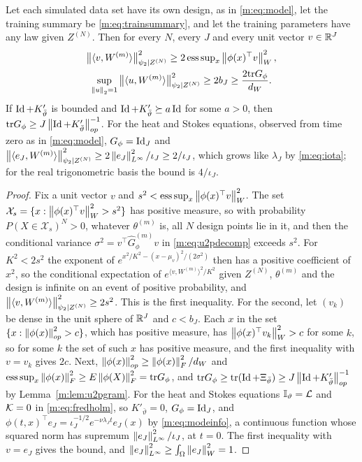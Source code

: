 \begin{proposition}\label{m:prop:u2pfalse}
Let each simulated data set have its own design, as in \eqref{m:eq:model}, let the training summary be \eqref{m:eq:trainsummary}, and let the training parameters have any law given $Z^{(N)}$. Then for every $N$, every $J$ and every unit vector $v\in\mathbb{R}^J$
\[
\begin{gathered}
\big\|\langle v,W^{(m)}\rangle\big\|^2_{\psi_2\mid Z^{(N)}}\ge2\,\mathrm{ess\,sup}_x\left\|\phi(x)^\top v\right\|^2_W ,\\
\sup_{\left\|u\right\|_2=1}\big\|\langle u,W^{(m)}\rangle\big\|^2_{\psi_2\mid Z^{(N)}}\ge2b_J\ge\frac{2\mathrm{tr} G_\phi}{d_W} .
\end{gathered}
\]
If $\operatorname{Id}+K'_{\bar\vartheta}$ is bounded and $\operatorname{Id}+K'_{\bar\vartheta}\succeq a\operatorname{Id}$ for some $a>0$, then $\mathrm{tr} G_\phi\ge J\left\|\operatorname{Id}+K'_{\bar\vartheta}\right\|^{-1}_{op}$. For the heat and Stokes equations, observed from time zero as in \eqref{m:eq:model}, $G_\phi=\operatorname{Id}_J$ and $\left\|\langle e_J,W^{(m)}\rangle\right\|^2_{\psi_2\mid Z^{(N)}}\ge2\left\|e_J\right\|^2_{L^\infty}/\iota_J\ge2/\iota_J$, which grows like $\lambda_J$ by \eqref{m:eq:iota}; for the real trigonometric basis the bound is $4/\iota_J$.
\end{proposition}

\begin{proof}
Fix a unit vector $v$ and $s^2<\mathrm{ess\,sup}_x\left\|\phi(x)^\top v\right\|^2_W$. The set $\mathcal X_s=\{x:\left\|\phi(x)^\top v\right\|^2_W>s^2\}$ has positive measure, so with probability $P(X\in\mathcal X_s)^N>0$, whatever $\theta^{(m)}$ is, all $N$ design points lie in it, and then the conditional variance $\sigma^2=v^\top\hat G^{(m)}_\phi v$ in \eqref{m:eq:u2pdecomp} exceeds $s^2$. For $K^2<2s^2$ the exponent of $e^{x^2/K^2-(x-\mu_v)^2/(2\sigma^2)}$ then has a positive coefficient of $x^2$, so the conditional expectation of $e^{\langle v,W^{(m)}\rangle^2/K^2}$ given $Z^{(N)}$, $\theta^{(m)}$ and the design is infinite on an event of positive probability, and $\left\|\langle v,W^{(m)}\rangle\right\|^2_{\psi_2\mid Z^{(N)}}\ge2s^2$. This is the first inequality. For the second, let $(v_k)$ be dense in the unit sphere of $\mathbb{R}^J$ and $c<b_J$. Each $x$ in the set $\{x:\left\|\phi(x)\right\|^2_{op}>c\}$, which has positive measure, has $\left\|\phi(x)^\top v_k\right\|^2_W>c$ for some $k$, so for some $k$ the set of such $x$ has positive measure, and the first inequality with $v=v_k$ gives $2c$. Next, $\left\|\phi(x)\right\|^2_{op}\ge\left\|\phi(x)\right\|^2_F/d_W$ and $\mathrm{ess\,sup}_x\left\|\phi(x)\right\|^2_F\ge E\left\|\phi(X)\right\|^2_F=\mathrm{tr} G_\phi$, and $\mathrm{tr} G_\phi\ge\mathrm{tr}(\operatorname{Id}+\Xi_{\bar\vartheta})\ge J\left\|\operatorname{Id}+K'_{\bar\vartheta}\right\|^{-1}_{op}$ by Lemma~\ref{m:lem:u2pgram}. For the heat and Stokes equations $\mathbb{I}_\vartheta=\mathcal{L}$ and $\mathcal{K}=0$ in \eqref{m:eq:fredholm}, so $K'_{\bar\vartheta}=0$, $G_\phi=\operatorname{Id}_J$, and $\phi(t,x)^\top e_J=\iota_J^{-1/2}e^{-\nu\lambda_Jt}e_J(x)$ by \eqref{m:eq:modeinfo}, a continuous function whose squared norm has supremum $\left\|e_J\right\|^2_{L^\infty}/\iota_J$, at $t=0$. The first inequality with $v=e_J$ gives the bound, and $\left\|e_J\right\|^2_{L^\infty}\ge\int_\Omega\left\|e_J\right\|^2_W=1$.
\end{proof}

